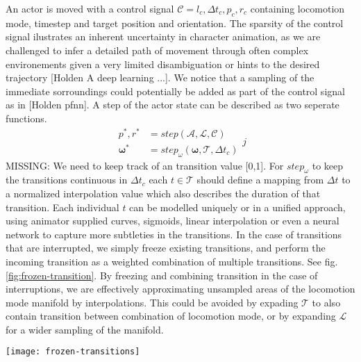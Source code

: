 An actor is moved with a control signal $\mathcal{C}=l_c,\Delta{t}_c, p_c,r_c$ containing locomotion mode, timestep and target position and orientation. The sparsity of the control signal ilustrates an inherent uncertainty in character animation, as we are challenged to infer a detailed path of movement through often complex environements given a very limited disambiguation or hints to the desired trajectory [Holden A deep learning ...]. We notice that a sampling of the immediate sorroundings could potentially be added as part of the control signal as in [Holden pfnn]. A step of the actor state can be described as two seperate functions.
\begin{equation}
\begin{split}
p^*,r^*&=step(\mathcal{A},\mathcal{L}, \mathcal{C})\\
\boldsymbol{\omega}^*&=step_{\omega}(\boldsymbol{\omega},\mathcal{T}, \Delta{t}_c)
\end{split}j
\end{equation}
MISSING: We need to keep track of an transition value [0,1]. For $step_{\omega}$ to keep the transitions continuous in $\Delta{t}_c$ each $t\in\mathcal{T}$ should define a mapping from $\Delta{t}$ to a normalized interpolation value which also describes the duration of that transition. Each individual $t$ can be modelled uniquely or in a unified approach, using animator supplied curves, sigmoids, linear interpolation or even a neural network to capture more subtleties in the transitions. In the case of transitions that are interrupted, we simply freeze existing transitions, and perform the incoming transition as a weighted combination of multiple transitions. See fig. \ref{fig:frozen-transition}. By freezing and combining transition in the case of interruptions, we are effectively approximating unsampled areas of the locomotion mode manifold by interpolations. This could be avoided by expading $\mathcal{T}$ to also contain transition between combination of locomotion mode, or by expanding $\mathcal{L}$ for a wider sampling of the manifold.  
\begin{figure*}
  \texttt{[image: frozen-transitions]}
  \caption{Frozen transition}
  \label{fig:frozen-transition}
\end{figure*}


